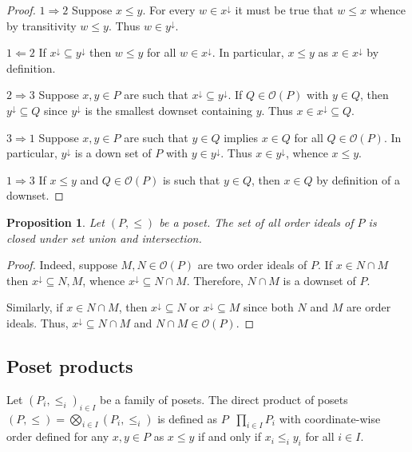 \documentclass[a4paper]{article}
\newcommand{\brac}[1]{{\left ( #1 \right )}}
\newcommand{\Ocal}{\mathcal{O}}
\newtheorem{prop}{Proposition}
\newcommand{\defn}{\mathop{\overset{\Delta}{=}}\nolimits}
\begin{document}
\begin{proof}
$1 \Rightarrow 2$ Suppose $x\leq y$. For every $w\in x^\downarrow$ it must be true that $w\leq x$ whence by transitivity $w\leq y$. Thus $w\in y^\downarrow$.

$1 \Leftarrow 2$ If $x^\downarrow\subseteq y^\downarrow$ then $w\leq y$ for all $w\in x^\downarrow$. In particular, $x\leq y$ as $x\in x^\downarrow$ by definition.

$2 \Rightarrow 3$ Suppose $x,y\in P$ are such that $x^\downarrow\subseteq y^\downarrow$. If $Q\in \Ocal(P)$ with $y\in Q$, then $y^\downarrow\subseteq Q$ since $y^\downarrow$ is the smallest downset containing $y$. Thus $x\in x^\downarrow\subseteq Q$.

$3 \Rightarrow 1$ Suppose $x,y\in P$ are such that $y\in Q$ implies $x\in Q$ for all $Q\in \Ocal(P)$. In particular, $y^\downarrow$ is a down set of $P$ with $y\in y^\downarrow$. Thus $x\in y^\downarrow$, whence $x\leq y$.

$1 \Rightarrow 3$ If $x\leq y$ and $Q\in \Ocal(P)$ is such that $y\in Q$, then $x\in Q$ by definition of a downset.
\end{proof}

\begin{prop} Let $(P,\leq)$ be a poset. The set of all order ideals of $P$ is closed under set union and intersection.
\end{prop}

\begin{proof}
Indeed, suppose $M,N\in \Ocal(P)$ are two order ideals of $P$. If $x\in N\cap M$ then $x^\downarrow \subseteq N,M$, whence $x^\downarrow\subseteq N\cap M$. Therefore, $N\cap M$ is a downset of $P$.

Similarly, if $x\in N\cap M$, then $x^\downarrow\subseteq N$ or $x^\downarrow\subseteq M$ since both $N$ and $M$ are order ideals. Thus, $x^\downarrow\subseteq N\cap M$ and $N\cap M \in \Ocal(P)$. 
\end{proof}


\subsection{Poset products} %
\label{sub:poset_products}

Let $\brac{P_i, \leq_i}_{i\in I}$ be a family of posets. The direct product of posets $(P,\leq) = \bigotimes_{i\in I} (P_i,\leq_i)$ is defined as $P\defn \prod_{i\in I} P_i$ with coordinate-wise order defined for any $x,y\in P$ as $x\leq y$ if and only if $x_i\leq_i y_i$ for all $i\in I$.
\end{document}
